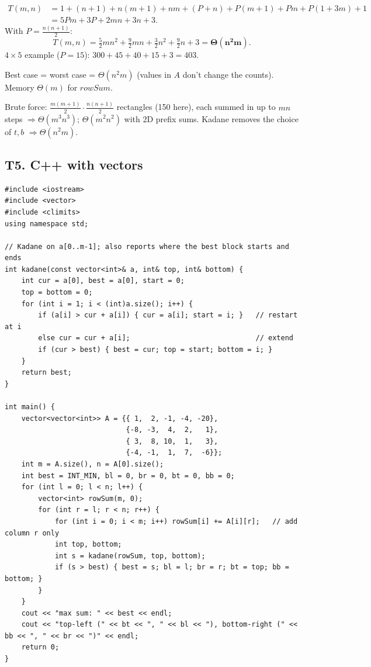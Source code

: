 \documentclass[11pt]{article}
\begin{document}
\begin{align*}
T(m,n) &= 1 + (n+1) + n(m+1) + nm + (P+n) + P(m+1) + Pm + P(1 + 3m) + 1\\
&= 5Pm + 3P + 2mn + 3n + 3.
\end{align*}
With $P = \frac{n(n+1)}{2}$:
\[
T(m,n) = \tfrac{5}{2}mn^2 + \tfrac{9}{2}mn + \tfrac{3}{2}n^2 + \tfrac{9}{2}n + 3 = \mathbf{\Theta(n^2 m)}.
\]
$4 \times 5$ example ($P = 15$): $300 + 45 + 40 + 15 + 3 = 403$.

Best case = worst case = $\Theta(n^2 m)$ (values in $A$ don't change the counts). Memory $\Theta(m)$ for $rowSum$.

Brute force: $\frac{m(m+1)}{2}\cdot\frac{n(n+1)}{2}$ rectangles (150 here), each summed in up to $mn$ steps $\Rightarrow \Theta(m^3 n^3)$; $\Theta(m^2 n^2)$ with 2D prefix sums. Kadane removes the choice of $t, b$ $\Rightarrow \Theta(n^2 m)$.

\subsection*{T5. C++ with vectors}

\begin{lstlisting}
#include <iostream>
#include <vector>
#include <climits>
using namespace std;

// Kadane on a[0..m-1]; also reports where the best block starts and ends
int kadane(const vector<int>& a, int& top, int& bottom) {
    int cur = a[0], best = a[0], start = 0;
    top = bottom = 0;
    for (int i = 1; i < (int)a.size(); i++) {
        if (a[i] > cur + a[i]) { cur = a[i]; start = i; }   // restart at i
        else cur = cur + a[i];                              // extend
        if (cur > best) { best = cur; top = start; bottom = i; }
    }
    return best;
}

int main() {
    vector<vector<int>> A = {{ 1,  2, -1, -4, -20},
                             {-8, -3,  4,  2,   1},
                             { 3,  8, 10,  1,   3},
                             {-4, -1,  1,  7,  -6}};
    int m = A.size(), n = A[0].size();
    int best = INT_MIN, bl = 0, br = 0, bt = 0, bb = 0;
    for (int l = 0; l < n; l++) {
        vector<int> rowSum(m, 0);
        for (int r = l; r < n; r++) {
            for (int i = 0; i < m; i++) rowSum[i] += A[i][r];   // add column r only
            int top, bottom;
            int s = kadane(rowSum, top, bottom);
            if (s > best) { best = s; bl = l; br = r; bt = top; bb = bottom; }
        }
    }
    cout << "max sum: " << best << endl;
    cout << "top-left (" << bt << ", " << bl << "), bottom-right (" << bb << ", " << br << ")" << endl;
    return 0;
}
\end{lstlisting}
\end{document}
